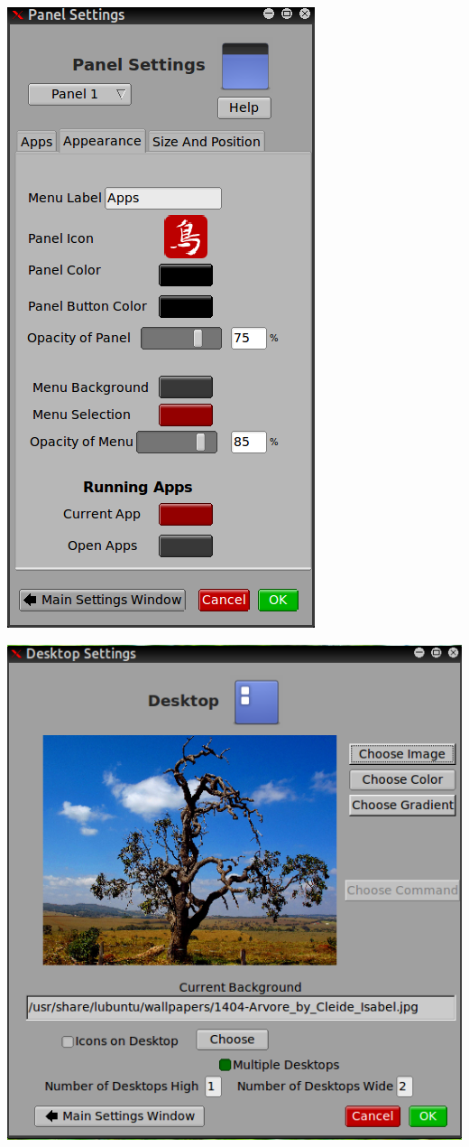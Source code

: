 \documentclass[12pt,a4paper]{book}
\begin{document}
\begin{center}
\includegraphics[width=0.7\linewidth]{panel-settings}
\end{center}


\begin{center}
\includegraphics[width=0.7\linewidth]{desktop-settings}
\end{center}
\end{document}
